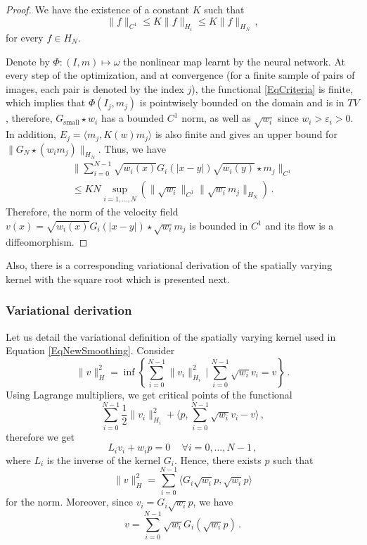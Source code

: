 \documentclass[10pt,twocolumn,letterpaper,table]{article}
\numberwithin{equation}{section}
\theoremstyle{plain}
\theoremstyle{definition}
\begin{document}
\begin{proof}
We have the existence of a constant $K$ such that 
\begin{equation}
\| f \|_{C^1} \leq K\| f \|_{H_i} \leq K\| f \|_{H_N} \,,
\end{equation}
for every $f \in H_N$.
\par
Denote by $\Phi: (I,m) \mapsto \omega$ the nonlinear map learnt by the neural network.
At every step of the optimization, and at convergence (for a finite sample of pairs of images, each pair is denoted by the index $j$), the functional \eqref{EqCriteria} is finite, which implies that $\Phi(I_j,m_j)$ is pointwisely bounded on the domain and is in $TV$, therefore, $G_{\text{small}} \star w_i$ has a bounded $C^1$ norm, as well as $\sqrt{w_i}$ since $w_i > \varepsilon_i >0$. In addition, $E_j = \langle m_j, K(w) m_j \rangle$ is also finite and gives an upper bound for $\| G_N \star (w_i m_j) \|_{H_N}$. Thus, we have
\begin{multline}
\| \sum_{i = 0}^{N-1} \sqrt{w_i(x)} G_i(|x-y|) \sqrt{w_i(y)} \star m_j \|_{C^1} \\ \leq KN \sup_{i = 1,\ldots,N} (\| \sqrt{w_i} \|_{C^1} \| \sqrt{w_i} m_j \|_{H_N})\,.
\end{multline}
Therefore, the norm of the velocity field $v(x) = \sqrt{w_i(x)} G_i(|x-y|) \star \sqrt{w_i}  m_j$ is bounded in $C^1$ and its flow is a diffeomorphism.
\end{proof}
Also, there is a corresponding variational derivation of the spatially varying kernel with the square root which is presented next.

\subsubsection{Variational derivation}
Let us detail the variational definition of the spatially varying kernel used in Equation \eqref{EqNewSmoothing}. 
Consider 
\begin{equation} \label{InfNorm}
  \|v\|_{H}^2 = \inf \left\{ \sum_{i=0}^{N-1} \|v_i\|_{H_i}^2 \, \Big | \, \sum_{i= 0}^{N-1} \sqrt{w_i} v_i = v \right \}\,.
\end{equation}
Using Lagrange multipliers, we get critical points of the functional 
\begin{equation}
  \sum_{i=0}^{N-1} \frac{1}{2}\|v_i\|_{H_i}^2 + \langle p ,  \sum_{i= 0}^{N-1} \sqrt{w_i} v_i -v\rangle\,,
\end{equation}
therefore we get
\begin{equation}
  L_iv_i + w_i p= 0\, \quad \forall i = 0,\ldots,N-1\,,
\end{equation}
where $L_i$ is the inverse of the kernel $G_i$.
Hence, there exists $p$ such that 
$$\|v\|_{H}^2 = \sum_{i=0}^{N-1} \langle G_i \sqrt{w_i} p,\sqrt{w_i} p \rangle$$ 
for the norm. Moreover, since $v_i = G_i \sqrt{w_i} p$, we have
\begin{equation}
  v = \sum_{i= 0}^{N-1} \sqrt{w_i} G_i (\sqrt{w_i} p)\,.
\end{equation}
\end{document}
